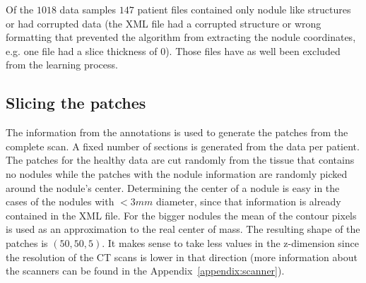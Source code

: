 \documentclass[../Thesis.tex]{subfiles}
\begin{document}
Of the $1018$ data samples $147$ patient files contained only nodule like structures or had corrupted data (the XML file had a corrupted structure or wrong formatting that prevented the algorithm from extracting the nodule coordinates, e.g. one file had a slice thickness of $0$). Those files have as well been excluded from the learning process.

\subsection{Slicing the patches}
The information from the annotations is used to generate the patches from the complete scan. A fixed number of sections is generated from the data per patient. The patches for the healthy data are cut randomly from the tissue that contains no nodules while the patches with the nodule information are randomly picked around the nodule's center. Determining the center of a nodule is easy in the cases of the nodules with $<3 mm$ diameter, since that information is already contained in the XML file. For the bigger nodules the mean of the contour pixels is used as an approximation to the real center of mass. The resulting shape of the patches is $(50,50,5)$. It makes sense to take less values in the z-dimension since the resolution of the CT scans is lower in that direction (more information about the scanners can be found in the Appendix~\ref{appendix:scanner}).
\end{document}
